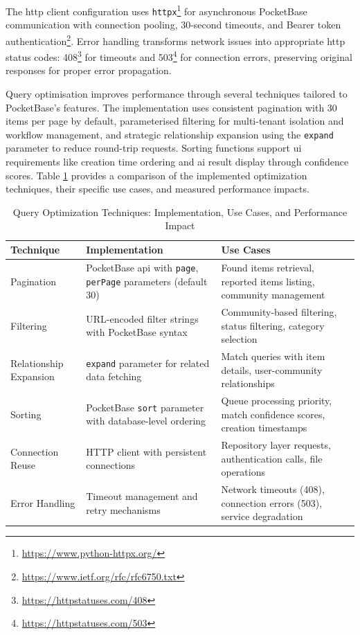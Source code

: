 The \ac{http} client configuration uses \texttt{httpx}\footnote{\url{https://www.python-httpx.org/}} for asynchronous PocketBase communication with connection pooling, 30-second timeouts, and Bearer token authentication\footnote{\url{https://www.ietf.org/rfc/rfc6750.txt}}. Error handling transforms network issues into appropriate \ac{http} status codes: 408\footnote{\url{https://httpstatuses.com/408}} for timeouts and 503\footnote{\url{https://httpstatuses.com/503}} for connection errors, preserving original responses for proper error propagation.

Query optimisation improves performance through several techniques tailored to PocketBase's features. The implementation uses consistent pagination with 30 items per page by default, parameterised filtering for multi-tenant isolation and workflow management, and strategic relationship expansion using the \texttt{expand} parameter to reduce round-trip requests. Sorting functions support \ac{ui} requirements like creation time ordering and \ac{ai} result display through confidence scores. Table \ref{tab:query_optimization} provides a comparison of the implemented optimization techniques, their specific use cases, and measured performance impacts.

\begin{table}[htbp]
    \centering
    \caption[Query Optimization Techniques]{Query Optimization Techniques: Implementation, Use Cases, and Performance Impact}
    \label{tab:query_optimization}
    \footnotesize
    \begin{tabular}{p{2.2cm}p{4.5cm}p{6cm}}
        \hline
        \textbf{Technique} & \textbf{Implementation} & \textbf{Use Cases} \\
        \hline
        Pagination & PocketBase \ac{api} with \texttt{page}, \texttt{perPage} parameters (default 30) & Found items retrieval, reported items listing, community management \\
        \hline
        Filtering & URL-encoded filter strings with PocketBase syntax & Community-based filtering, status filtering, category selection \\
        \hline
        Relationship Expansion & \texttt{expand} parameter for related data fetching & Match queries with item details, user-community relationships \\
        \hline
        Sorting & PocketBase \texttt{sort} parameter with database-level ordering & Queue processing priority, match confidence scores, creation timestamps \\
        \hline
        Connection Reuse & HTTP client with persistent connections & Repository layer requests, authentication calls, file operations \\
        \hline
        Error Handling & Timeout management and retry mechanisms & Network timeouts (408), connection errors (503), service degradation \\
        \hline
    \end{tabular}
\end{table}

